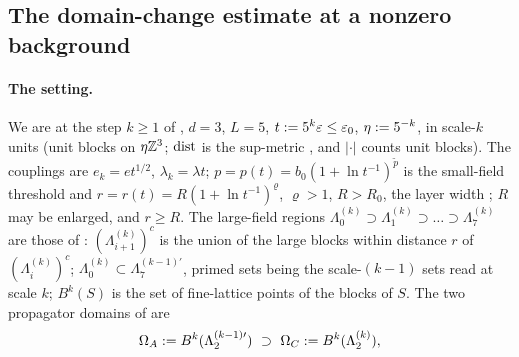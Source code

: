 
\subsection{The domain-change estimate at a nonzero background}\label{ssec:a07:dom}

\paragraph{The setting.} We are at the step $k\ge1$ of \cite[Sect.~2]{Ba2}, $d=3$, $L=5$, $t:=5^k\varepsilon\le\varepsilon_0$, $\eta:=5^{-k}$, in scale-$k$ units (unit blocks on $\eta\mathbb Z^3$; $\operatorname{dist}$ is the sup-metric \cite[(1.3)]{Ba1}, and $|\cdot|$ counts unit blocks). The couplings are $e_k=et^{1/2}$, $\lambda_k=\lambda t$; $p=p(t)=b_0(1+\ln t^{-1})^{\tilde p}$ is the small-field threshold and $r=r(t)=R(1+\ln t^{-1})^{\varrho}$, $\varrho>1$, $R>R_0$, the layer width \cite[(2.7), p.~558]{Ba2}; $R$ may be enlarged, and $r\ge R$. The large-field regions $\Lambda^{(k)}_0\supset\Lambda^{(k)}_1\supset\dots\supset\Lambda^{(k)}_7$ are those of \cite[(2.8), pp.~558, 566]{Ba2}: $(\Lambda^{(k)}_{i+1})^c$ is the union of the large blocks within distance $r$ of $(\Lambda^{(k)}_i)^c$; $\Lambda^{(k)}_0\subset\Lambda^{(k-1)\prime}_7$, primed sets being the scale-$(k-1)$ sets read at scale $k$; $B^k(S)$ is the set of fine-lattice points of the blocks of $S$. The two propagator domains of \cite[Prop.~2.6]{Ba2} are
\[
\Omega_{A}:= B^k(\Lambda^{(k-1)\prime}_2)\ \supset\ \Omega_{C}:= B^k(\Lambda^{(k)}_2),
\]
